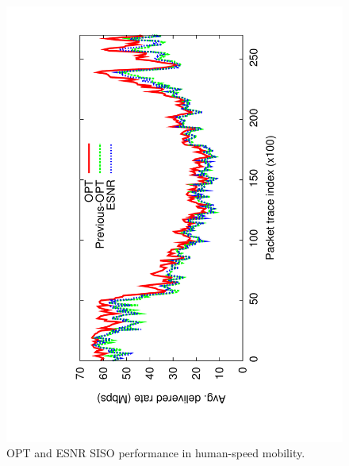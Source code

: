 \begin{figure}[t]
      \centering
      \includegraphics[angle=-90,viewport=120 68 491 760,clip,width=0.95\columnwidth]{figures/siso_rate_time_opt_eff.pdf}
      \caption{\label{fig:siso_rate_time_opt_eff} OPT and ESNR SISO performance in human-speed mobility.}
\end{figure}


